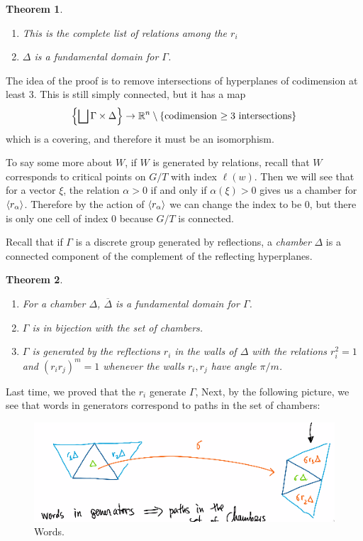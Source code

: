 \documentclass[leqno, openany]{memoir}
\newtheorem{thm}{Theorem}[section]
\theoremstyle{definition}
\theoremstyle{remark}
\theoremstyle{plain}
\theoremstyle{definition}
\theoremstyle{remark}
\newcommand{\R}{\mathbb{R}}
\newcommand{\ol}[1]{\overline{#1}}
\begin{document}
\begin{thm}
    \begin{enumerate}
        \item This is the complete list of relations among the $r_i$
        \item $\Delta$ is a fundamental domain for $\Gamma$.
    \end{enumerate}
\end{thm}

The idea of the proof is to remove intersections of hyperplanes of codimension at least $3$. This is still simply connected, but it has a map
\[ \qty{\bigsqcup \Gamma \times \Delta} \to \R^n \setminus \qty{\text{codimension $\geq 3$ intersections}} \]
which is a covering, and therefore it must be an isomorphism.

To say some more about $W$, if $W$ is generated by relations, recall that $W$ corresponds to critical points on $G/T$ with index $\ell(w)$. Then we will see that for a vector $\xi$, the relation $\alpha > 0$ if and only if $\alpha(\xi) > 0$ gives us a chamber for $\ev{r_{\alpha}}$. Therefore by the action of $\ev{r_{\alpha}}$ we can change the index to be $0$, but there is only one cell of index $0$ because $G/T$ is connected.

Recall that if $\Gamma$ is a discrete group generated by reflections, a \textit{chamber} $\Delta$ is a connected component of the complement of the reflecting hyperplanes.

\begin{thm}
    \begin{enumerate}
        \item For a chamber $\Delta$, $\ol{\Delta}$ is a fundamental domain for $\Gamma$.
        \item $\Gamma$ is in bijection with the set of chambers.
        \item $\Gamma$ is generated by the reflections $r_i$ in the walls of $\Delta$ with the relations $r_i^2 = 1$ and ${(r_i r_j)}^m = 1$ whenever the walls $r_i, r_j$ have angle $\pi / m$.
    \end{enumerate}
\end{thm}

Last time, we proved that the $r_i$ generate $\Gamma$, Next, by the following picture, we see that words in generators correspond to paths in the set of chambers:
\begin{figure}[H]
    \centering
    \includegraphics[width=0.8\linewidth]{words}
    \caption{Words.}%
    \label{fig:words}
\end{figure}
\end{document}
